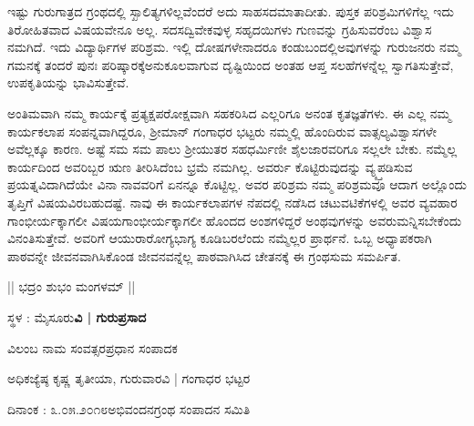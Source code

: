 {ಇಷ್ಟು ಗುರುಗಾತ್ರದ ಗ್ರಂಥದಲ್ಲಿ ಸ್ಖಾಲಿತ್ಯಗಳಿಲ್ಲವೆಂದರೆ ಅದು ಸಾಹಸದ\break ಮಾತಾದೀತು. ಪುಸ್ತಕ ಪರಿಶ್ರಮಿಗಳಿಗೆಲ್ಲ ಇದು ತಿರೋಹಿತವಾದ ವಿಷಯವೇನೂ ಅಲ್ಲ. ಸದಸದ್ವಿವೇಕವುಳ್ಳ ಸಹೃದಯಿಗಳು ಗುಣವನ್ನು ಗ್ರಹಿಸುವರೆಂಬ ವಿಶ್ವಾಸ ನಮಗಿದೆ. ಇದು ವಿದ್ಯಾರ್ಥಿಗಳ ಪರಿಶ್ರಮ. ಇಲ್ಲಿ ದೋಷಗಳೇನಾದರೂ ಕಂಡುಬಂದಲ್ಲಿ\break ಅವುಗಳನ್ನು ಗುರುಜನರು ನಮ್ಮ ಗಮನಕ್ಕೆ ತಂದರೆ ಪುನಃ ಪರಿಷ್ಕಾರಕ್ಕೆ\break ಅನುಕೂಲವಾಗುವ ದೃಷ್ಟಿಯಿಂದ ಅಂತಹ ಆಪ್ತ ಸಲಹೆಗಳನ್ನೆಲ್ಲ ಸ್ವಾಗತಿಸುತ್ತೇವೆ, ಉಪಕೃತಿಯನ್ನು ಭಾವಿಸುತ್ತೇವೆ.
\vskip 4pt

ಅಂತಿಮವಾಗಿ \enginline{-} ನಮ್ಮ ಕಾರ್ಯಕ್ಕೆ ಪ್ರತ್ಯಕ್ಷ\enginline{-}ಪರೋಕ್ಷವಾಗಿ ಸಹಕರಿಸಿದ ಎಲ್ಲರಿಗೂ ಅನಂತ ಕೃತಜ್ಞತೆಗಳು. ಈ ಎಲ್ಲ ನಮ್ಮ ಕಾರ್ಯಕಲಾಪ ಸಂಪನ್ನವಾಗಿದ್ದರೂ, ಶ್ರೀಮಾನ್ ಗಂಗಾಧರ ಭಟ್ಟರು ನಮ್ಮಲ್ಲಿ ಹೊಂದಿರುವ ವಾತ್ಸಲ್ಯ\enginline{-}ವಿಶ್ವಾಸಗಳೇ ಅವೆಲ್ಲಕ್ಕೂ ಕಾರಣ. ಅಷ್ಟೆ ಸಮ \enginline{-} ಸಮ ಪಾಲು ಶ್ರೀಯುತರ ಸಹಧರ್ಮಿಣೀ \enginline{-} ಶೈಲಜಾರವರಿಗೂ ಸಲ್ಲಲೇ ಬೇಕು.  ನಮ್ಮೆಲ್ಲ ಕಾರ್ಯದಿಂದ ಅವರಿಬ್ಬರ ಋಣ ತೀರಿಸಿದೆಂಬ ಭ್ರಮೆ ನಮಗಿಲ್ಲ. ಅವರ್ರು ಕೊಟ್ಟಿರುವುದನ್ನು ವ್ಯ್ಕ್ತಪಡಿಸುವ ಪ್ರಯತ್ನವಿದಾಗಿದೆಯೇ ವಿನಾ ನಾವವರಿಗೆ ಏನನ್ನೂ ಕೊಟ್ಟಿಲ್ಲ. ಅವರ ಪರಿಶ್ರಮ ನಮ್ಮ ಪರಿಶ್ರಮವೂ ಆದಾಗ ಅಲ್ಲೊಂದು ತೃಪ್ತಿಗೆ ವಿಷಯವಿರಬಹುದಷ್ಟೆ. ನಾವು  ಈ ಕಾರ್ಯಕಲಾಪಗಳ ನೆಪದಲ್ಲಿ ನಡೆಸಿದ ಚಟುವಟಿಕೆಗಳಲ್ಲಿ ಅವರ ವ್ಯವಹಾರ ಗಾಂಭೀರ್ಯಕ್ಕಾಗಲೀ ವಿಷಯ\break ಗಾಂಭೀರ್ಯಕ್ಕಾಗಲೀ ಹೊಂದದ ಅಂಶಗಳಿದ್ದರೆ ಅಂಥವುಗಳನ್ನು ಅವರು\break ಮನ್ನಿಸಬೇಕೆಂದು ವಿನಂತಿಸುತ್ತೇವೆ. ಅವರಿಗೆ ಆಯುರಾರೋಗ್ಯಭಾಗ್ಯ ಕೂಡಿಬರಲೆಂದು ನಮ್ಮೆಲ್ಲರ ಪ್ರಾರ್ಥನೆ. ಒಬ್ಬ ಅಧ್ಯಾಪಕರಾಗಿ ಪಾಠವನ್ನೇ ಜೀವನವಾಗಿಸಿಕೊಂಡ ಜೀವನವನ್ನೆಲ್ಲ ಪಾಠವಾಗಿಸಿದ ಚೇತನಕ್ಕೆ ಈ ಗ್ರಂಥಸುಮ ಸಮರ್ಪಿತ.
\bigskip

\centerline{|| ಭದ್ರಂ ಶುಭಂ ಮಂಗಳಮ್ ||}
\bigskip

\noindent
ಸ್ಥಳ : ಮೈಸೂರು\hfill \textbf{ವಿ | ಗುರುಪ್ರಸಾದ}

\noindent	
ವಿಲಂಬ ನಾಮ ಸಂವತ್ಸರ\hfill ಪ್ರಧಾನ ಸಂಪಾದಕ

\noindent	
ಅಧಿಕಜ್ಯೆಷ್ಠ ಕೃಷ್ಣ ತೃತೀಯಾ, ಗುರುವಾರ\hfill ವಿ | ಗಂಗಾಧರ ಭಟ್ಟರ

\noindent
ದಿನಾಂಕ : ೩.೦೫.೨೦೧೮\hfill ಅಭಿವಂದನಗ್ರಂಥ ಸಂಪಾದನ ಸಮಿತಿ
}				
